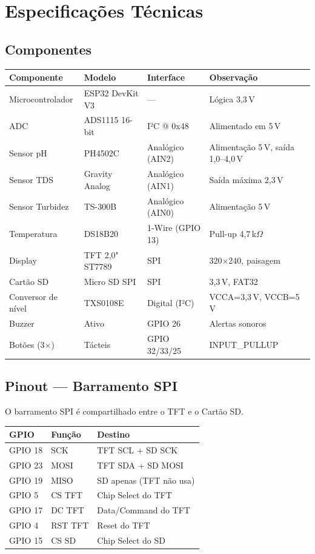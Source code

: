 \documentclass[12pt,a4paper]{article}
\begin{document}
\section{Especificações Técnicas}

\subsection{Componentes}

\begin{tabularx}{\textwidth}{l l l X}
\toprule
\textbf{Componente} & \textbf{Modelo} & \textbf{Interface} & \textbf{Observação} \\
\midrule
Microcontrolador & ESP32 DevKit V3 & --- & Lógica 3,3\,V \\
ADC & ADS1115 16-bit & I²C @ 0x48 & Alimentado em 5\,V \\
Sensor pH & PH4502C & Analógico (AIN2) & Alimentação 5\,V, saída 1,0--4,0\,V \\
Sensor TDS & Gravity Analog & Analógico (AIN1) & Saída máxima 2,3\,V \\
Sensor Turbidez & TS-300B & Analógico (AIN0) & Alimentação 5\,V \\
Temperatura & DS18B20 & 1-Wire (GPIO 13) & Pull-up 4,7\,k$\Omega$ \\
Display & TFT 2,0" ST7789 & SPI & 320$\times$240, paisagem \\
Cartão SD & Micro SD SPI & SPI & 3,3\,V, FAT32 \\
Conversor de nível & TXS0108E & Digital (I²C) & VCCA=3,3\,V, VCCB=5\,V \\
Buzzer & Ativo & GPIO 26 & Alertas sonoros \\
Botões (3$\times$) & Tácteis & GPIO 32/33/25 & INPUT\_PULLUP \\
\bottomrule
\end{tabularx}

\subsection{Pinout --- Barramento SPI}

O barramento SPI é compartilhado entre o TFT e o Cartão SD.

\begin{tabularx}{\textwidth}{l l X}
\toprule
\textbf{GPIO} & \textbf{Função} & \textbf{Destino} \\
\midrule
GPIO 18 & SCK & TFT SCL + SD SCK \\
GPIO 23 & MOSI & TFT SDA + SD MOSI \\
GPIO 19 & MISO & SD apenas (TFT não usa) \\
GPIO 5 & CS TFT & Chip Select do TFT \\
GPIO 17 & DC TFT & Data/Command do TFT \\
GPIO 4 & RST TFT & Reset do TFT \\
GPIO 15 & CS SD & Chip Select do SD \\
\bottomrule
\end{tabularx}
\end{document}
